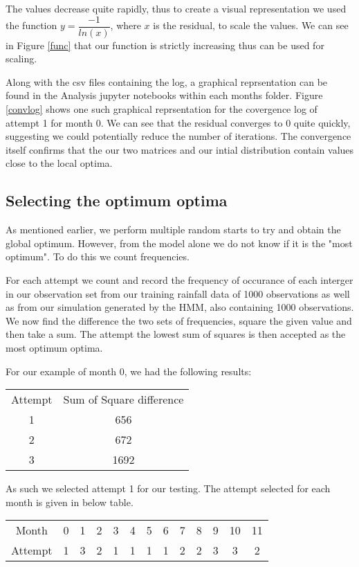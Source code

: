 The values decrease quite rapidly, thus to create a visual representation we used the function $ y = \dfrac{-1}{ln(x)}$, where $x$ is the residual, to scale the values. We can see in Figure \ref{func} that our function is strictly increasing thus can be used for scaling. 

Along with the csv files containing the log, a graphical reprsentation can be found in the Analysis jupyter notebooks within each months folder. Figure \ref{convlog} shows one such graphical reprsentation for the covergence log of attempt 1 for month 0. We can see that the residual converges to 0 quite quickly, suggesting we could potentially reduce the number of iterations. The convergence itself confirms that the our two matrices and our intial distribution contain values close to the local optima. 





\subsection{Selecting the optimum optima}

As mentioned earlier, we perform multiple random starts to try and obtain the global optimum. However, from the model alone we do not know if it is the "most optimum". To do this we count frequencies. 

For each attempt we count and record the frequency of occurance of each interger in our observation set from our training rainfall data of 1000 observations as well as from our simulation generated by the HMM, also containing 1000 observations. We now find the difference the two sets of frequencies, square the given value and then take a sum. The attempt the lowest sum of squares is then accepted as the most optimum optima. 

For our example of month 0, we had the following results:
\begin{center}
  \begin{tabular}{c c}
    Attempt & Sum of Square difference \\
    1 & 656 \\
    2 & 672 \\
    3 & 1692
  \end{tabular}
\end{center}

As such we selected attempt 1 for our testing. The attempt selected for each month is given in below table.

\begin{center}
  \begin{tabular}{c c c c c c c c c c c c c}
    Month   &  0  & 1 & 2 & 3 & 4 & 5 & 6 & 7 & 8 & 9 & 10 & 11 \\
    Attempt &  1  & 3 & 2 & 1 & 1 & 1 & 1 & 2 & 2 & 3 & 3  & 2 
  \end{tabular}  
\end{center}

